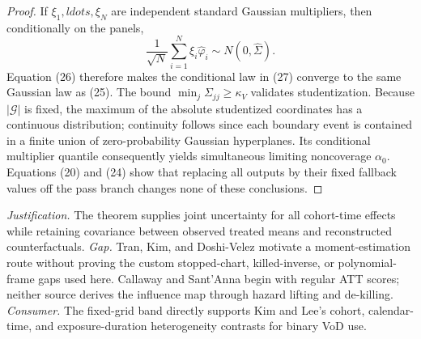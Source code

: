 \documentclass{article}
\begin{document}
\begin{proof}
If \(\xi_1,ldots,\xi_N\) are independent standard Gaussian multipliers, then conditionally on the panels,
\[
 \frac1{\sqrt N}\sum_{i=1}^N\xi_i\widehat\varphi_i
 \sim N(0,\widehat\Sigma).                                   \tag{27}
\]
Equation (26) therefore makes the conditional law in (27) converge to the same Gaussian law as (25).  The bound \(\min_j\Sigma_{jj}\ge\kappa_V\) validates studentization.  Because \(|\mathcal G|\) is fixed, the maximum of the absolute studentized coordinates has a continuous distribution; continuity follows since each boundary event is contained in a finite union of zero-probability Gaussian hyperplanes.  Its conditional multiplier quantile consequently yields simultaneous limiting noncoverage \(\alpha_0\).  Equations (20) and (24) show that replacing all outputs by their fixed fallback values off the pass branch changes none of these conclusions.
\end{proof}
\par\smallskip\noindent \textit{Justification.} The theorem supplies joint uncertainty for all cohort-time effects while retaining covariance between observed treated means and reconstructed counterfactuals. \textit{Gap.} Tran, Kim, and Doshi-Velez motivate a moment-estimation route without proving the custom stopped-chart, killed-inverse, or polynomial-frame gaps used here. Callaway and Sant'Anna begin with regular ATT scores; neither source derives the influence map through hazard lifting and de-killing. \textit{Consumer.} The fixed-grid band directly supports Kim and Lee's cohort, calendar-time, and exposure-duration heterogeneity contrasts for binary VoD use.
\end{document}
